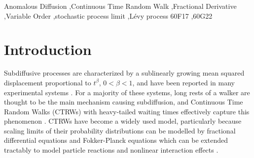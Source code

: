 \documentclass[a4paper,12pt]{elsarticle}
\numberwithin{equation}{section}
\theoremstyle{plain}
\theoremstyle{definition}
\theoremstyle{remark}
\numberwithin{equation}{section}
\newcommand{\1}{\mathbf 1}
\begin{document}
\begin{frontmatter}




\begin{keyword}
Anomalous Diffusion \sep Continuous Time Random Walk \sep Fractional Derivative \sep Variable Order \sep stochastic process limit \sep L\'evy process
\MSC[2010] 60F17 \sep  60G22
\end{keyword}

\end{frontmatter}


\section{Introduction}

Subdiffusive processes are characterized by a sublinearly growing mean squared
displacement proportional to $t^\beta$, $0 < \beta < 1$, and have been reported
in many experimental systems
\cite{Metzler2000,TMT04,Santamaria2006a,Banks2005,Regner2013}.
For a majority of these systems, long rests of a walker are thought to be the
main mechanism causing subdiffusion, and Continuous Time Random Walks (CTRWs)
with heavy-tailed waiting times effectively capture this phenomenon
\cite{Scher1975,BG1990,Metzler2000}.  CTRWs have become a widely used model,
particularly because scaling limits of their probability distributions can be
modelled by fractional differential equations and Fokker-Planck equations
\cite{BMK00,Baeumer2001,HLS10PRL,Hahn11} which can be extended tractably to
model particle reactions \cite{Langlands2008d,Angstmann2013} and nonlinear
interaction effects \cite{StrakaFedotov14}.
\end{document}
